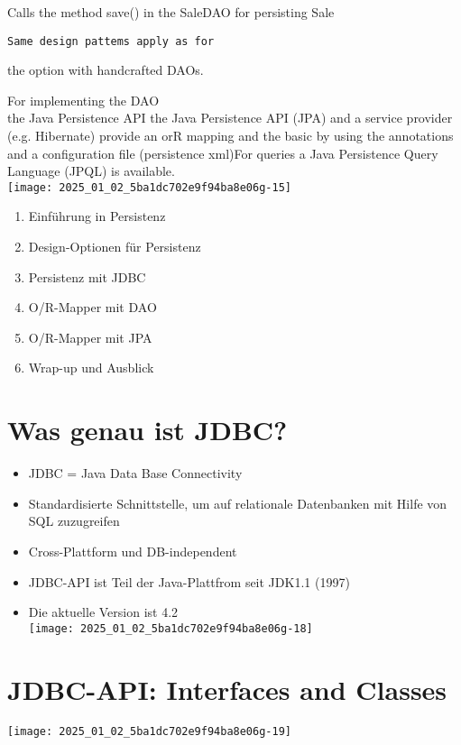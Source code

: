Calls the method save() in the SaleDAO for persisting Sale

\begin{verbatim}
Same design pattems apply as for
\end{verbatim}

the option with handcrafted DAOs.

For implementing the DAO\\
the Java Persistence API the Java Persistence API (JPA) and a service provider (e.g. Hibernate) provide an orR mapping and the basic by using the annotations and a configuration file (persistence xml)For queries a Java Persistence Query Language (JPQL) is available.\\
\texttt{[image: 2025\_01\_02\_5ba1dc702e9f94ba8e06g-15]}

\begin{enumerate}
  \item Einführung in Persistenz
  \item Design-Optionen für Persistenz
  \item Persistenz mit JDBC
  \item O/R-Mapper mit DAO
  \item O/R-Mapper mit JPA
  \item Wrap-up und Ausblick
\end{enumerate}

\section*{Was genau ist JDBC?}
\begin{itemize}
  \item JDBC = Java Data Base Connectivity
  \item Standardisierte Schnittstelle, um auf relationale Datenbanken mit Hilfe von SQL zuzugreifen
  \item Cross-Plattform und DB-independent
  \item JDBC-API ist Teil der Java-Plattfrom seit JDK1.1 (1997)
  \item Die aktuelle Version ist 4.2\\
\texttt{[image: 2025\_01\_02\_5ba1dc702e9f94ba8e06g-18]}
\end{itemize}

\section*{JDBC-API: Interfaces and Classes}
\begin{center}
\texttt{[image: 2025\_01\_02\_5ba1dc702e9f94ba8e06g-19]}
\end{center}

